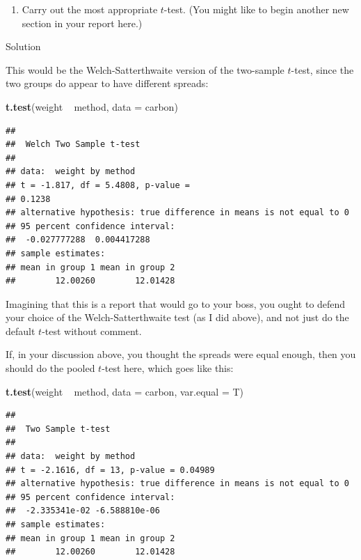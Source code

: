 \documentclass[]{tufte-book}
\newenvironment{Shaded}{}{}
\newcommand{\DataTypeTok}[1]{\textcolor[rgb]{0.56,0.13,0.00}{#1}}
\newcommand{\KeywordTok}[1]{\textcolor[rgb]{0.00,0.44,0.13}{\textbf{#1}}}
\newcommand{\NormalTok}[1]{#1}
\newcommand{\OperatorTok}[1]{\textcolor[rgb]{0.40,0.40,0.40}{#1}}
\newcommand{\StringTok}[1]{\textcolor[rgb]{0.25,0.44,0.63}{#1}}
\providecommand{\tightlist}{%
  \setlength{\itemsep}{0pt}\setlength{\parskip}{0pt}}
\theoremstyle{definition}
\theoremstyle{definition}
\theoremstyle{definition}
\theoremstyle{remark}
\begin{document}
\begin{enumerate}
\def\labelenumi{(\alph{enumi})}
\setcounter{enumi}{5}
\tightlist
\item
  Carry out the most appropriate \(t\)-test. (You might like to begin
  another new section in your report here.)
\end{enumerate}

Solution

This would be the Welch-Satterthwaite version of the two-sample
\(t\)-test, since the two groups do appear to have different spreads:

\begin{Shaded}
\begin{Highlighting}[]
\KeywordTok{t.test}\NormalTok{(weight }\OperatorTok{~}\StringTok{ }\NormalTok{method, }\DataTypeTok{data =}\NormalTok{ carbon)}
\end{Highlighting}
\end{Shaded}

\begin{verbatim}
## 
##  Welch Two Sample t-test
## 
## data:  weight by method
## t = -1.817, df = 5.4808, p-value =
## 0.1238
## alternative hypothesis: true difference in means is not equal to 0
## 95 percent confidence interval:
##  -0.027777288  0.004417288
## sample estimates:
## mean in group 1 mean in group 2 
##        12.00260        12.01428
\end{verbatim}

Imagining that this is a report that would go to your boss, you ought to
defend your choice of the Welch-Satterthwaite test (as I did above), and
not just do the default \(t\)-test without comment.

If, in your discussion above, you thought the spreads were equal enough,
then you should do the pooled \(t\)-test here, which goes like this:

\begin{Shaded}
\begin{Highlighting}[]
\KeywordTok{t.test}\NormalTok{(weight }\OperatorTok{~}\StringTok{ }\NormalTok{method, }\DataTypeTok{data =}\NormalTok{ carbon, }\DataTypeTok{var.equal =}\NormalTok{ T)}
\end{Highlighting}
\end{Shaded}

\begin{verbatim}
## 
##  Two Sample t-test
## 
## data:  weight by method
## t = -2.1616, df = 13, p-value = 0.04989
## alternative hypothesis: true difference in means is not equal to 0
## 95 percent confidence interval:
##  -2.335341e-02 -6.588810e-06
## sample estimates:
## mean in group 1 mean in group 2 
##        12.00260        12.01428
\end{verbatim}
\end{document}
